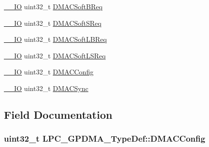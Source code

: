 \begin{DoxyCompactItemize}
\item 
\hyperlink{LPC17xx_8h_aec43007d9998a0a0e01faede4133d6be}{\+\_\+\+\_\+\+IO} uint32\+\_\+t \hyperlink{structLPC__GPDMA__TypeDef_a8e625662ecc8bf38cb26a5f49261b8be}{D\+M\+A\+C\+Soft\+B\+Req}
\item 
\hyperlink{LPC17xx_8h_aec43007d9998a0a0e01faede4133d6be}{\+\_\+\+\_\+\+IO} uint32\+\_\+t \hyperlink{structLPC__GPDMA__TypeDef_ae8034553a3c3c6bfaec53a07c9aa9b74}{D\+M\+A\+C\+Soft\+S\+Req}
\item 
\hyperlink{LPC17xx_8h_aec43007d9998a0a0e01faede4133d6be}{\+\_\+\+\_\+\+IO} uint32\+\_\+t \hyperlink{structLPC__GPDMA__TypeDef_a480687100c43187a4b86ba87b6eb494c}{D\+M\+A\+C\+Soft\+L\+B\+Req}
\item 
\hyperlink{LPC17xx_8h_aec43007d9998a0a0e01faede4133d6be}{\+\_\+\+\_\+\+IO} uint32\+\_\+t \hyperlink{structLPC__GPDMA__TypeDef_a580306b5b2109c49dd6be3009a360559}{D\+M\+A\+C\+Soft\+L\+S\+Req}
\item 
\hyperlink{LPC17xx_8h_aec43007d9998a0a0e01faede4133d6be}{\+\_\+\+\_\+\+IO} uint32\+\_\+t \hyperlink{structLPC__GPDMA__TypeDef_ae338d90b22df63aa0f346ec864e87cc6}{D\+M\+A\+C\+Config}
\item 
\hyperlink{LPC17xx_8h_aec43007d9998a0a0e01faede4133d6be}{\+\_\+\+\_\+\+IO} uint32\+\_\+t \hyperlink{structLPC__GPDMA__TypeDef_a7f32a90d23582dccffefe4f5b46fa841}{D\+M\+A\+C\+Sync}
\end{DoxyCompactItemize}


\subsection{Field Documentation}
\subsubsection[{\texorpdfstring{D\+M\+A\+C\+Config}{DMACConfig}}]{ uint32\+\_\+t L\+P\+C\+\_\+\+G\+P\+D\+M\+A\+\_\+\+Type\+Def\+::\+D\+M\+A\+C\+Config}\hypertarget{structLPC__GPDMA__TypeDef_ae338d90b22df63aa0f346ec864e87cc6}{}\label{structLPC__GPDMA__TypeDef_ae338d90b22df63aa0f346ec864e87cc6}
